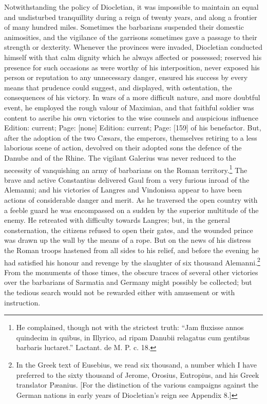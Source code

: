Notwithstanding the policy of Diocletian, it was impossible to maintain an equal and undisturbed tranquillity during a reign of twenty years, and along a frontier of many hundred miles. Sometimes the barbarians suspended their domestic animosities, and the vigilance of the garrisons sometimes gave a passage to their strength or dexterity. Whenever the provinces were invaded, Diocletian conducted himself with that calm dignity which he always affected or possessed; reserved his presence for such occasions as were worthy of his interposition, never exposed his person or reputation to any unnecessary danger, ensured his success by every means that prudence could suggest, and displayed, with ostentation, the consequences of his victory. In wars of a more difficult nature, and more doubtful event, he employed the rough valour of Maximian, and that faithful soldier was content to ascribe his own victories to the wise counsels and auspicious influence Edition: current; Page: [none] Edition: current; Page: [159] of his benefactor. But, after the adoption of the two Cæsars, the emperors, themselves retiring to a less laborious scene of action, devolved on their adopted sons the defence of the Danube and of the Rhine. The vigilant Galerius was never reduced to the necessity of vanquishing an army of barbarians on the Roman territory.\footnote{He complained, though not with the strictest truth: \texthebrew{“}Jam fluxisse annos quindecim in quibus, in Illyrico, ad ripam Danubii relagatus cum gentibus barbaris luctaret.\texthebrew{}” Lactant. de M. P. c. 18.} The brave and active Constantius delivered Gaul from a very furious inroad of the Alemanni; and his victories of Langres and Vindonissa appear to have been actions of considerable danger and merit. As he traversed the open country with a feeble guard he was encompassed on a sudden by the superior multitude of the enemy. He retreated with difficulty towards Langres; but, in the general consternation, the citizens refused to open their gates, and the wounded prince was drawn up the wall by the means of a rope. But on the news of his distress the Roman troops hastened from all sides to his relief, and before the evening he had satisfied his honour and revenge by the slaughter of six thousand Alemanni.\footnote{In the Greek text of Eusebius, we read six thousand, a number which I have preferred to the sixty thousand of Jerome, Orosius, Eutropius, and his Greek translator Pæanius. [For the distinction of the various campaigns against the German nations in early years of Diocletian\texthebrew{}’s reign see Appendix 8.]} From the monuments of those times, the obscure traces of several other victories over the barbarians of Sarmatia and Germany might possibly be collected; but the tedious search would not be rewarded either with amusement or with instruction.

